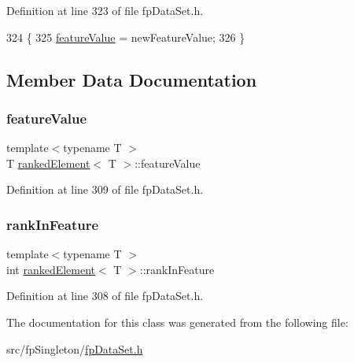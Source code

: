Definition at line 323 of file fp\+Data\+Set.\+h.


\begin{DoxyCode}
324         \{
325             \hyperlink{classrankedElement_a710e6e4cc93b791e5cd1fd21716be2e9}{featureValue} = newFeatureValue;
326         \}
\end{DoxyCode}


\subsection{Member Data Documentation}
\mbox{\label{classrankedElement_a710e6e4cc93b791e5cd1fd21716be2e9}} 
\subsubsection{\texorpdfstring{feature\+Value}{featureValue}}
{\footnotesize\ttfamily template$<$typename T $>$ \\
T \hyperlink{classrankedElement}{ranked\+Element}$<$ T $>$\+::feature\+Value\hspace{0.3cm}{\ttfamily [private]}}



Definition at line 309 of file fp\+Data\+Set.\+h.

\mbox{\label{classrankedElement_a419244fe97e0bace27a3cb7db7639e1c}} 
\subsubsection{\texorpdfstring{rank\+In\+Feature}{rankInFeature}}
{\footnotesize\ttfamily template$<$typename T $>$ \\
int \hyperlink{classrankedElement}{ranked\+Element}$<$ T $>$\+::rank\+In\+Feature\hspace{0.3cm}{\ttfamily [private]}}



Definition at line 308 of file fp\+Data\+Set.\+h.



The documentation for this class was generated from the following file\+:\begin{DoxyCompactItemize}
\item 
src/fp\+Singleton/\hyperlink{fpDataSet_8h}{fp\+Data\+Set.\+h}\end{DoxyCompactItemize}
